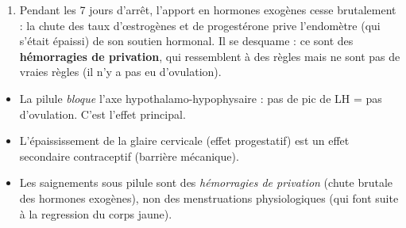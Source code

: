 \documentclass[11pt]{article}
\begin{document}
\begin{corrige}
\begin{enumerate}
Chez l'utilisatrice, les taux de FSH et de LH restent \textbf{bas et sans pic} pendant les 21 jours de prise, contrairement au cycle naturel qui présente un pic de LH (et un pic plus modeste de FSH) au 14\ieme{} jour.
\item Pendant les 7 jours d'arrêt, l'apport en hormones exogènes cesse brutalement : la chute des taux d'œstrogènes et de progestérone prive l'endomètre (qui s'était épaissi) de son soutien hormonal. Il se desquame : ce sont des \textbf{hémorragies de privation}, qui ressemblent à des règles mais ne sont pas de vraies règles (il n'y a pas eu d'ovulation).
\end{enumerate}
\end{corrige}

\begin{attention}
\begin{itemize}
\item La pilule \emph{bloque} l'axe hypothalamo-hypophysaire : pas de pic de LH = pas d'ovulation. C'est l'effet principal.
\item L'épaississement de la glaire cervicale (effet progestatif) est un effet secondaire contraceptif (barrière mécanique).
\item Les saignements sous pilule sont des \emph{hémorragies de privation} (chute brutale des hormones exogènes), non des menstruations physiologiques (qui font suite à la regression du corps jaune).
\end{itemize}
\end{attention}
\end{document}
